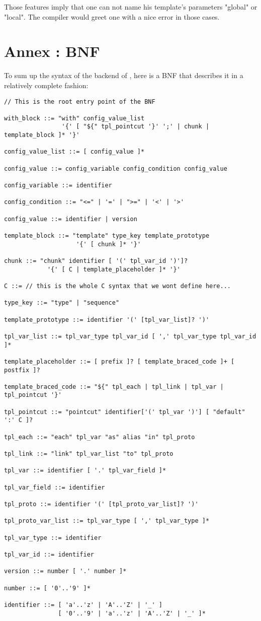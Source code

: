 \documentclass[american]{rtxreport}
\begin{document}
Those features imply that one can not name his template's parameters "global"
or "local". The compiler would greet one with a nice error in those cases.


\section{Annex : BNF}

To sum up the syntax of the backend of \rtx, here is a BNF that describes it
in a relatively complete fashion:

\lstset{}
\begin{lstlisting}
// This is the root entry point of the BNF

with_block ::= "with" config_value_list
                '{' [ "${" tpl_pointcut '}' ';' | chunk | template_block ]* '}'

config_value_list ::= [ config_value ]*

config_value ::= config_variable config_condition config_value

config_variable ::= identifier

config_condition ::= "<=" | '=' | ">=" | '<' | '>'

config_value ::= identifier | version

template_block ::= "template" type_key template_prototype
                    '{' [ chunk ]* '}'

chunk ::= "chunk" identifier [ '(' tpl_var_id ')']?
            '{' [ C | template_placeholder ]* '}'

C ::= // this is the whole C syntax that we wont define here...

type_key ::= "type" | "sequence"

template_prototype ::= identifier '(' [tpl_var_list]? ')'

tpl_var_list ::= tpl_var_type tpl_var_id [ ',' tpl_var_type tpl_var_id ]*

template_placeholder ::= [ prefix ]? [ template_braced_code ]+ [ postfix ]?

template_braced_code ::= "${" tpl_each | tpl_link | tpl_var | tpl_pointcut '}'

tpl_pointcut ::= "pointcut" identifier['(' tpl_var ')'] [ "default" ':' C ]?

tpl_each ::= "each" tpl_var "as" alias "in" tpl_proto

tpl_link ::= "link" tpl_var_list "to" tpl_proto

tpl_var ::= identifier [ '.' tpl_var_field ]*

tpl_var_field ::= identifier

tpl_proto ::= identifier '(' [tpl_proto_var_list]? ')'

tpl_proto_var_list ::= tpl_var_type [ ',' tpl_var_type ]*

tpl_var_type ::= identifier

tpl_var_id ::= identifier

version ::= number [ '.' number ]*

number ::= [ '0'..'9' ]*

identifier ::= [ 'a'..'z' | 'A'..'Z' | '_' ]
               [ '0'..'9' | 'a'..'z' | 'A'..'Z' | '_' ]*

\end{lstlisting}
\end{document}
